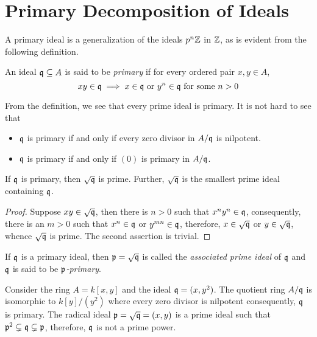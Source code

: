 \section{Primary Decomposition of Ideals}

A primary ideal is a generalization of the ideals $p^n\mathbb{Z}$ in $\mathbb{Z}$, as is evident from the following definition.

\begin{definition}
    An ideal $\mathfrak q\subseteq A$ is said to be \textit{primary} if for every ordered pair $x,y\in A$,
    \begin{equation*}
        xy\in\mathfrak q\implies x\in\mathfrak q\text{ or }y^n\in\mathfrak q\text{ for some } n > 0
    \end{equation*}
\end{definition}


From the definition, we see that every prime ideal is primary. It is not hard to see that
\begin{itemize}
\item $\mathfrak q$ is primary if and only if every zero divisor in $A/\mathfrak q$ is nilpotent. 
\item $\mathfrak q$ is primary if and only if $(0)$ is primary in $A/\mathfrak q$.
\end{itemize}


\begin{proposition}
    If $\mathfrak q$ is primary, then $\sqrt{\mathfrak q}$ is prime. Further, $\sqrt{\mathfrak q}$ is the smallest prime ideal containing $\mathfrak q$.
\end{proposition}
\begin{proof}
    Suppose $xy\in\sqrt{\mathfrak q}$, then there is $n > 0$ such that $x^ny^n\in\mathfrak q$, consequently, there is an $m > 0$ such that $x^n\in\mathfrak q$ or $y^{mn}\in\mathfrak q$, therefore, $x\in\sqrt{\mathfrak q}$ or $y\in\sqrt{\mathfrak q}$, whence $\sqrt{\mathfrak q}$ is prime. The second assertion is trivial.
\end{proof}

If $\mathfrak q$ is a primary ideal, then $\mathfrak p = \sqrt{\mathfrak q}$ is called the \textit{associated prime ideal} of $\mathfrak q$ and $\mathfrak q$ is said to be \textit{$\mathfrak p$-primary}.

Consider the ring $A = k[x,y]$ and the ideal $\mathfrak q = (x,y^2)$. The quotient ring $A/\mathfrak q$ is isomorphic to $k[y]/(y^2)$ where every zero divisor is nilpotent consequently, $\mathfrak q$ is primary. The radical ideal $\mathfrak p = \sqrt{\mathfrak q} = (x,y)$ is a prime ideal such that $\mathfrak p^2\subsetneq\mathfrak q\subsetneq\mathfrak p$, therefore, $\mathfrak q$ is not a prime power.

